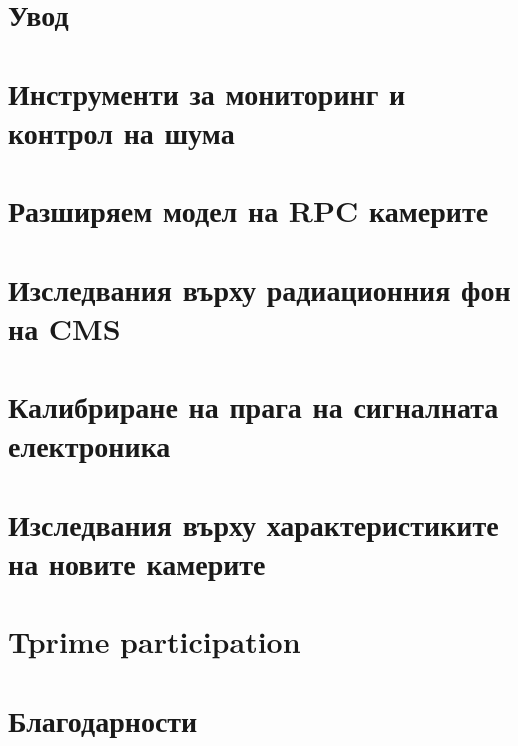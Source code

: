 \documentclass[12pt,a4paper]{book}
\begin{document}
\tableofcontents

\chapter{Увод}


\chapter{Инструменти за мониторинг и контрол на шума}
\chapter{Разширяем модел на RPC камерите}
\chapter{Изследвания върху радиационния фон на CMS}
\chapter{Калибриране на прага на сигналната електроника}
\chapter{Изследвания върху характеристиките на новите камерите}
\chapter{Tprime participation}
\chapter{Благодарности}

%

%
\end{document}
